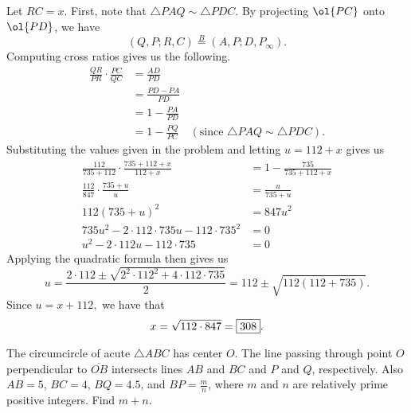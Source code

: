 \documentclass[letterpaper,oneside]{scrartcl}
\begin{document}
\begin{soln}
  Let \(RC = x\). First, note that \(\triangle PAQ \sim \triangle PDC\). By projecting \(\ol{PC}\) onto \(\ol{PD}\), we have
  \[(Q,P;R,C)\overset{B}{=}(A,P;D,P_\infty).\]
  Computing cross ratios gives us the following.
  \begin{align*}
    \frac{QR}{PR}\cdot\frac{PC}{QC} & = \frac{AD}{PD}                                                            \\
                                    & = \frac{PD-PA}{PD}                                                         \\
                                    & = 1 - \frac{PA}{PD}                                                        \\
                                    & = 1- \frac{PQ}{PC} \quad (\text{since } \triangle PAQ \sim \triangle PDC).
  \end{align*}
  Substituting the values given in the problem and letting \(u = 112+x\) gives us
  \begin{align*}
    \frac{112}{735+112}\cdot\frac{735+112+x}{112+x} & = 1 - \frac{735}{735+112+x} \\
    \frac{112}{847}\cdot\frac{735+u}{u}             & = \frac{u}{735+u}           \\
    112(735+u)^2                                    & = 847u^2                    \\
    735u^2-2\cdot112\cdot735u - 112\cdot735^2       & = 0                         \\
    u^2-2\cdot112u - 112\cdot735                    & = 0
  \end{align*}
  Applying the quadratic formula then gives us
  \[u = \frac{2\cdot112\pm \sqrt{2^2\cdot112^2 + 4\cdot 112\cdot735}}{2} = 112 \pm \sqrt{112(112+735)}.\]
  Since \(u = x+112,\) we have that
  \[x = \sqrt{112\cdot847} = \fbox{308}.\]
\end{soln}
\begin{problem*}
  [2015 AIME II \#11]
  The circumcircle of acute $\triangle ABC$ has center $O$. The line passing through point $O$ perpendicular to $\overline{OB}$ intersects lines $AB$ and $BC$ and $P$ and $Q$, respectively. Also $AB=5$, $BC=4$, $BQ=4.5$, and $BP=\frac{m}{n}$, where $m$ and $n$ are relatively prime positive integers. Find $m+n$.
\end{problem*}
\end{document}
